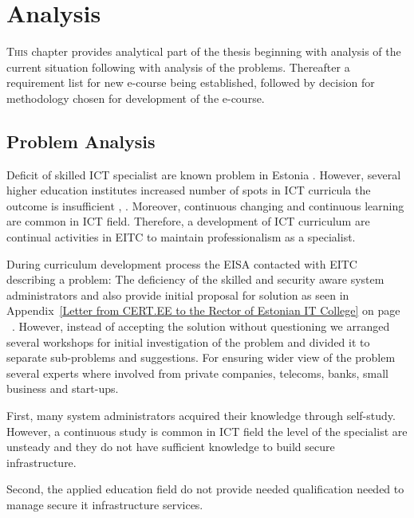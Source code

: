 \chapter{Analysis}
\label{analysis}

\lettrine[lraise=0.1, nindent=0em, slope=-.5em]{\color{Violet}T}{his} chapter provides analytical part of the thesis beginning with analysis of the current situation following with analysis of the problems. Thereafter a requirement list for new e-course being established, followed by decision for methodology chosen for development of the e-course. 

\section{Problem Analysis}
\label{Problem Analysis}


Deficit of skilled \gls{ICT} specialist are known problem in Estonia \citep{website:ict_puudu} \citep{website:ict_needs}. However, several higher education institutes increased number of spots in \gls{ICT} curricula the outcome is insufficient \citep{website:TU_ict}, \citep{website:itc_facts}. Moreover, continuous changing and continuous learning are common in \gls{ICT} field. Therefore, a development of \gls{ICT} curriculum are continual activities in \gls{EITC} to maintain professionalism as a specialist.

During curriculum development process the \gls{EISA} contacted with \gls{EITC} describing a problem: The deficiency of the skilled and security aware system administrators and also provide initial proposal for solution as seen in Appendix~\ref{Letter from CERT.EE to the Rector of Estonian IT College} on page ~\pageref{Letter from CERT.EE to the Rector of Estonian IT College}. However, instead of accepting the solution without questioning we arranged several workshops for initial investigation of the problem and divided it to separate sub-problems and suggestions. For ensuring wider view of the problem several experts where involved from private companies, telecoms, banks, small business and start-ups.

First, many system administrators acquired their knowledge through self-study. However, a continuous study is common in \gls{ICT} field the level of the specialist are unsteady and they do not have sufficient knowledge to build secure infrastructure.

Second, the applied education field do not provide needed qualification needed to manage secure it infrastructure services.

